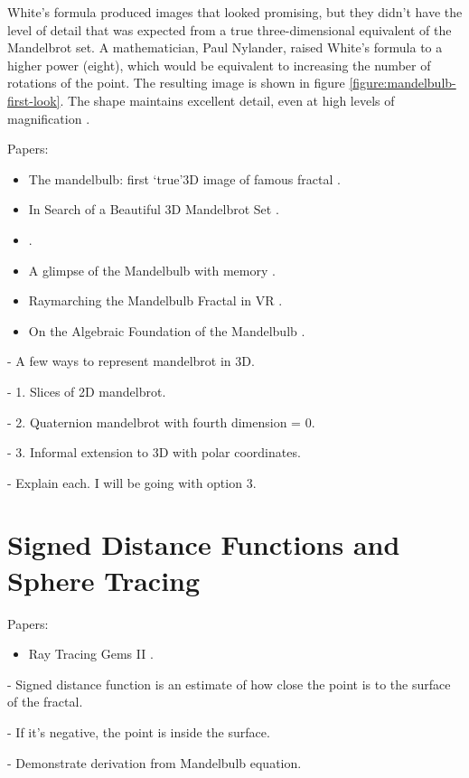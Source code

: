 White's formula produced images that looked promising, but they didn't have the level of detail that was expected from a true three-dimensional equivalent of the Mandelbrot set. A mathematician, Paul Nylander, raised White's formula to a higher power (eight), which would be equivalent to increasing the number of rotations of the point. The resulting image is shown in figure \ref{figure:mandelbulb-first-look}. The shape maintains excellent detail, even at high levels of magnification \cite {aron2009mandelbulb}.\newline

Papers:
\begin{itemize}
	\item The mandelbulb: first ‘true’3D image of famous fractal \cite{aron2009mandelbulb}.
	\item In Search of a Beautiful 3D Mandelbrot Set \cite{rucker2009search}.
	\item .
	\item A glimpse of the Mandelbulb with memory \cite{alonso2016glimpse}.
	\item Raymarching the Mandelbulb Fractal in VR \cite{letz2018raymarching}.
	\item On the Algebraic Foundation of the Mandelbulb \cite{boily2022algebraic}.
\end{itemize}

- A few ways to represent mandelbrot in 3D.

- 1. Slices of 2D mandelbrot.

- 2. Quaternion mandelbrot with fourth dimension = 0.

- 3. Informal extension to 3D with polar coordinates.

- Explain each. I will be going with option 3.

\section{Signed Distance Functions and Sphere Tracing}

Papers:
\begin{itemize}
	\item Ray Tracing Gems II \cite{marrs2021ray}.
\end{itemize}

- Signed distance function is an estimate of how close the point is to the surface of the fractal.

-  If it's negative, the point is inside the surface.

- Demonstrate derivation from Mandelbulb equation.

